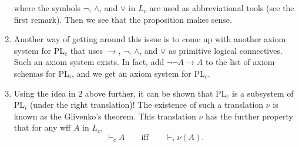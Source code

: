 \documentclass[12pt]{article}
\begin{document}
\begin{enumerate}
where the symbols $\neg$, $\land$, and $\lor$ in $L_c$ are used as abbreviational tools (see the first remark).  Then we see that the proposition makes sense.
\item 
Another way of getting around this issue is to come up with another axiom system for PL$_c$ that uses $\to$, $\neg$, $\land$, and $\lor$ as primitive logical connectives.  Such an axiom system exists.  In fact, add $\neg \neg A \to A$ to the list of axiom schemas for PL$_i$, and we get an axiom system for PL$_c$.
\item
Using the idea in 2 above further, it can be shown that PL$_c$ is a subsystem of PL$_i$ (under the right translation)!  The existence of such a translation $\nu$ is known as the Glivenko's theorem.  This translation $\nu$ has the further property that for any wff $A$ in $L_c$, $$\vdash_c A \qquad\mbox{iff} \qquad \vdash_i \nu(A).$$
\end{enumerate}

\end{document}
